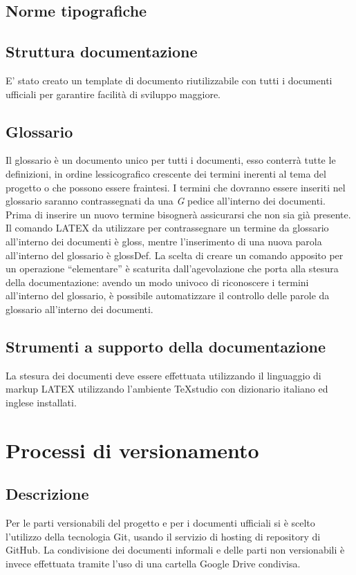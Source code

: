 \documentclass[NormeDiProgetto.tex]{subfiles}
\begin{document}
	\subsection{Norme tipografiche}
	
	\subsection{Struttura documentazione}
	E' stato creato un template di documento riutilizzabile con tutti i documenti ufficiali per garantire facilità di sviluppo maggiore.
	
	\subsection{Glossario}
	Il glossario è un documento unico per tutti i documenti, esso conterrà tutte le definizioni, in ordine lessicografico
	crescente dei termini inerenti al tema del progetto o che possono essere fraintesi. I termini che dovranno essere
	inseriti nel glossario saranno contrassegnati da una \textit{G} pedice all’interno dei documenti. Prima di inserire un nuovo termine bisognerà assicurarsi che non sia già presente.
	Il comando LATEX da utilizzare per contrassegnare un termine da glossario all’interno dei documenti è gloss, mentre l’inserimento di una nuova parola all’interno del glossario è glossDef.
	La scelta di creare un comando apposito per un operazione “elementare” è scaturita dall’agevolazione che porta
	alla stesura della documentazione: avendo un modo univoco di riconoscere i termini all’interno del glossario, è
	possibile automatizzare il controllo delle parole da glossario all’interno dei documenti.
	
	
	\subsection{Strumenti a supporto della documentazione} %
	La stesura dei documenti deve essere effettuata utilizzando il linguaggio di markup LATEX utilizzando l'ambiente TeXstudio con dizionario italiano ed inglese installati.
	
	
	\section{Processi di versionamento}
	
	\subsection{Descrizione}
	Per le parti versionabili del progetto e per i documenti ufficiali si è scelto l'utilizzo della tecnologia Git, usando il servizio di hosting di repository di GitHub.
	La condivisione dei documenti informali e delle parti non versionabili è invece effettuata tramite l'uso di una cartella Google Drive condivisa.
	
\end{document}
